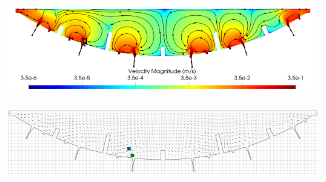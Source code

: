         \begin{figure}
            \begin{centering}
                \begin{subfigure}{\textwidth}
                    \begin{centering}
                        \includegraphics[width=0.9\textwidth]{diagrams/results-mri/simulated-placenta/simulated-placenta-velocity.png}
                        \caption{}
                    \end{centering}
                \end{subfigure}
                \vspace{4mm} %
                \begin{subfigure}{\textwidth}
                    \begin{centering}
                        \includegraphics[width=0.9\textwidth]{diagrams/results-mri/simulated-placenta/simulated-placenta-voxels.png}
                        \caption{}
                        \label{fig:mri-placenta-comparison-1:voxels}
                    \end{centering}
                \end{subfigure}
                \begin{subfigure}{0.45\textwidth}
                    \begin{centering}

\end{centering}
\end{subfigure}
\end{centering}
\end{figure}
